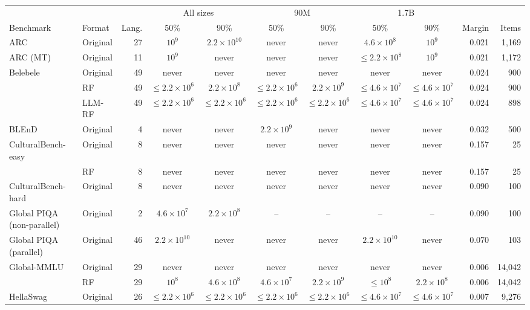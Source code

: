 \begin{tabular}{llrccccccrr}
\toprule
 & & & \multicolumn{2}{c}{All sizes} & \multicolumn{2}{c}{90M} & \multicolumn{2}{c}{1.7B} & & \\
\cmidrule(lr){4-5}\cmidrule(lr){6-7}\cmidrule(lr){8-9}
Benchmark & Format & Lang. & 50\% & 90\% & 50\% & 90\% & 50\% & 90\% & Margin & Items \\
\midrule
ARC & Original & 27 & $10^{9}$ & $2.2\times10^{10}$ & never & never & $4.6\times10^{8}$ & $10^{9}$ & 0.021 & 1{,}169 \\
\addlinespace
ARC (MT) & Original & 11 & $10^{9}$ & never & never & never & $\leq 2.2\times10^{8}$ & $10^{9}$ & 0.021 & 1{,}172 \\
\addlinespace
Belebele & Original & 49 & never & never & never & never & never & never & 0.024 & 900 \\
 & RF & 49 & $\leq 2.2\times10^{6}$ & $2.2\times10^{8}$ & $\leq 2.2\times10^{6}$ & $2.2\times10^{9}$ & $\leq 4.6\times10^{7}$ & $\leq 4.6\times10^{7}$ & 0.024 & 900 \\
 & LLM-RF & 49 & $\leq 2.2\times10^{6}$ & $\leq 2.2\times10^{6}$ & $\leq 2.2\times10^{6}$ & $\leq 2.2\times10^{6}$ & $\leq 4.6\times10^{7}$ & $\leq 4.6\times10^{7}$ & 0.024 & 898 \\
\addlinespace
BLEnD & Original & 4 & never & never & $2.2\times10^{9}$ & never & never & never & 0.032 & 500 \\
\addlinespace
CulturalBench-easy & Original & 8 & never & never & never & never & never & never & 0.157 & 25 \\
 & RF & 8 & never & never & never & never & never & never & 0.157 & 25 \\
\addlinespace
CulturalBench-hard & Original & 8 & never & never & never & never & never & never & 0.090 & 100 \\
\addlinespace
Global PIQA (non-parallel) & Original & 2 & $4.6\times10^{7}$ & $2.2\times10^{8}$ & -- & -- & -- & -- & 0.090 & 100 \\
\addlinespace
Global PIQA (parallel) & Original & 46 & $2.2\times10^{10}$ & never & never & never & $2.2\times10^{10}$ & never & 0.070 & 103 \\
\addlinespace
Global-MMLU & Original & 29 & never & never & never & never & never & never & 0.006 & 14{,}042 \\
 & RF & 29 & $10^{8}$ & $4.6\times10^{8}$ & $4.6\times10^{7}$ & $2.2\times10^{9}$ & $\leq 10^{8}$ & $2.2\times10^{8}$ & 0.006 & 14{,}042 \\
\addlinespace
HellaSwag & Original & 26 & $\leq 2.2\times10^{6}$ & $\leq 2.2\times10^{6}$ & $\leq 2.2\times10^{6}$ & $\leq 2.2\times10^{6}$ & $\leq 4.6\times10^{7}$ & $\leq 4.6\times10^{7}$ & 0.007 & 9{,}276 \\

\end{tabular}
